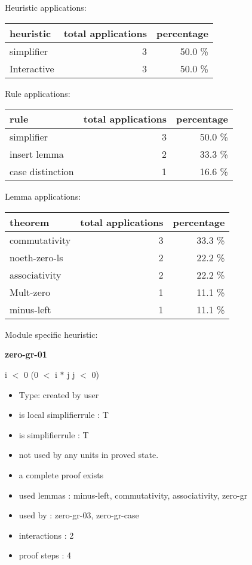 \documentclass[a4paper]{article}
\begin{document}
\medskip


Heuristic applications:

\begin{supertabular}{l|r|r}
heuristic	& total applications & percentage \\ \hline
simplifier & 3 & 50.0 \% \\
Interactive & 3 & 50.0 \% \\

\end{supertabular}

Rule applications:

\begin{supertabular}{l|r|r}
rule	        & total applications & percentage \\ \hline
simplifier & 3 & 50.0 \% \\
insert lemma & 2 & 33.3 \% \\
case distinction & 1 & 16.6 \% \\

\end{supertabular}

Lemma applications:

\begin{supertabular}{l|r|r}
theorem	        & total applications & percentage \\ \hline
commutativity & 3 & 33.3 \% \\
noeth-zero-ls & 2 & 22.2 \% \\
associativity & 2 & 22.2 \% \\
Mult-zero & 1 & 11.1 \% \\
minus-left & 1 & 11.1 \% \\

\end{supertabular}

Module specific heuristic:

\pagebreak

{\LARGE\bf zero-gr-01}\label{lemma-zero-gr-01}

\medskip

 \Fol i $<$ 0 \Imp (0 $<$ i $*$ j \Equiv j $<$ 0)

\begin{itemize}

\item Type: created by user

\item is local simplifierrule : T
\item is simplifierrule : T
\item not used by any units in proved state.
\item       a complete proof exists
\item       used lemmas  : minus-left, commutativity, associativity, zero-gr
\item       used by      : zero-gr-03, zero-gr-case
\item       interactions : 2
\item       proof steps  : 4
\end{itemize}
\end{document}
